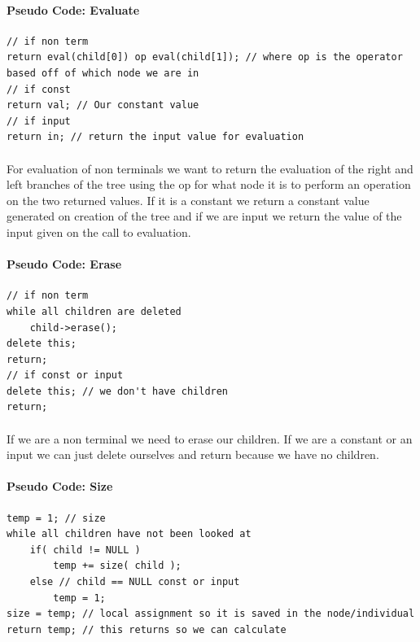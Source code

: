 \documentclass[paper=a4, fontsize=11pt]{scrartcl} %
\numberwithin{equation}{section} %
\numberwithin{figure}{section} %
\numberwithin{table}{section} %
\begin{document}
\paragraph{Pseudo Code: Evaluate}
\begin{verbatim}
// if non term
return eval(child[0]) op eval(child[1]); // where op is the operator based off of which node we are in
// if const
return val; // Our constant value
// if input
return in; // return the input value for evaluation
\end{verbatim}

\paragraph{} For evaluation of non terminals we want to return the evaluation of the right and left branches of the tree using the op for what node it is to perform an operation on the two returned values. If it is a constant we return a constant value generated on creation of the tree and if we are input we return the value of the input given on the call to evaluation.

\paragraph{Pseudo Code: Erase}
\begin{verbatim}
// if non term
while all children are deleted
    child->erase();
delete this;
return;
// if const or input
delete this; // we don't have children
return;
\end{verbatim}

\paragraph{} If we are a non terminal we need to erase our children. If we are a constant or an input we can just delete ourselves and return because we have no children.

\paragraph{Pseudo Code: Size}
\begin{verbatim}
temp = 1; // size
while all children have not been looked at
    if( child != NULL )
        temp += size( child );
    else // child == NULL const or input
        temp = 1;
size = temp; // local assignment so it is saved in the node/individual
return temp; // this returns so we can calculate
\end{verbatim}
\end{document}
